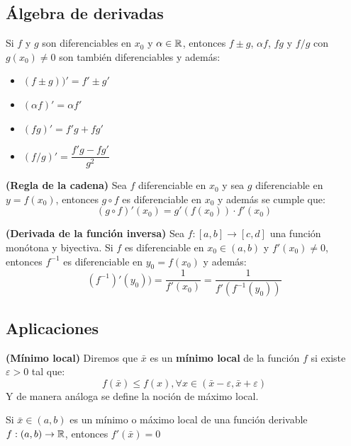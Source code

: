 \subsection{Álgebra de derivadas}

\begin{proposicion}
	Si $f$ y $g$ son diferenciables en $x_0$ y $\alpha \in \mathbb{R}$, entonces $f \pm g$, $\alpha f$, $fg$ y $f/g$ con $g(x_0) \neq 0$ son también diferenciables y además: 
	\begin{itemize}
		\item $(f\pm g))' = f' \pm g'$
		\item $(\alpha f) ' = \alpha f'$
		\item $(fg)' = f'g + f g'$
		\item $(f/g)' = \dfrac{f'g - fg'}{g^2}$
	\end{itemize}
\end{proposicion}

\begin{teorema}
	\textbf{(Regla de la cadena)}
	Sea $f$ diferenciable en $x_0$ y sea $g$ diferenciable en $y = f(x_0)$, entonces $g\circ f$ es diferenciable en $x_0$ y además se cumple que: 
	$$ (g\circ f)'(x_0) = g'(f(x_0))\cdot f'(x_0) $$ 
\end{teorema}

\begin{proposicion}
	\textbf{(Derivada de la función inversa)}
	Sea $f:[a,b] \rightarrow [c,d]$ una función monótona y biyectiva. Si $f$ es diferenciable en $x_0 \in (a,b)$ y $f'(x_0) \neq 0$, entonces $f^{-1}$ es diferenciable en $y_0 = f(x_0)$ y además: 
	$$ (f^{-1})'(y_0)) =\dfrac{1}{f'(x_0)} = \dfrac{1}{f'(f^{-1}(y_0))} $$
\end{proposicion}

\subsection{Aplicaciones}
\begin{definicion}
	\textbf{(Mínimo local)}
	Diremos que $\bar{x}$ es un \textbf{mínimo local} de la función $f$ si existe $\varepsilon > 0$ tal que: 
	$$ f(\bar{x}) \leq f(x) , \forall x \in (\bar{x}- \varepsilon , \bar{x} + \varepsilon ) $$ 
	Y de manera análoga se define la noción de máximo local. 
\end{definicion}

\begin{teorema}
	Si $\bar{x} \in (a,b)$ es un mínimo o máximo local de una función derivable $f: (a,b) \rightarrow \mathbb{R}$, entonces $f'(\bar{x}) = 0$
\end{teorema}

